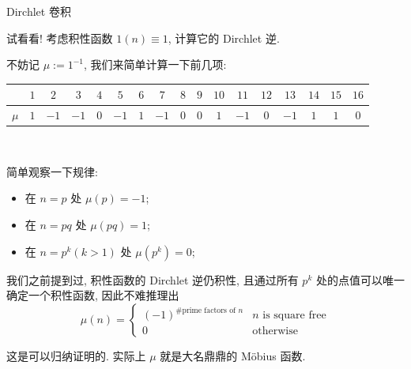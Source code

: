 \documentclass{beamer}
\begin{document}
    \begin{frame}{Dirchlet 卷积}
        \begin{block}{试看看!}
            考虑积性函数 $1(n)\equiv 1$, 计算它的 Dirchlet 逆.
        \end{block}
        \pause
        不妨记 $\mu:=1^{-1}$, 我们来简单计算一下前几项:
        \begin{center}
            \begin{tabular}{c|cccccccccccccccc}
                \toprule
                      & $1$ & $2$  & $3$  & $4$ & $5$  & $6$ & $7$  & $8$ & $9$ & $10$ & $11$ & $12$ & $13$ & $14$ & $15$ & $16$\\
                \hline
                $\mu$ & $1$ & $-1$ & $-1$ & $0$ & $-1$ & $1$ & $-1$ & $0$ & $0$ & $1$  & $-1$ &  $0$ & $-1$ &  $1$ &  $1$ &  $0$\\
                \bottomrule
            \end{tabular}\\
        \end{center}
        简单观察一下规律:
        \begin{itemize}
            \item 在 $n=p$ 处 $\mu(p)=-1$;
            \item 在 $n=pq$ 处 $\mu(pq)=1$;
            \item 在 $n=p^k(k>1)$ 处 $\mu(p^k)=0$;
        \end{itemize}
        我们之前提到过, 积性函数的 Dirchlet 逆仍积性, 且通过所有 $p^k$ 处的点值可以唯一确定一个积性函数, 因此不难推理出
        $$
        \mu(n)=\begin{cases}
        (-1)^{\#\text{prime factors of }n} & n\text{ is square free}\\
        0 & \text{otherwise}
        \end{cases}
        $$

        这是可以归纳证明的. 实际上 $\mu$ 就是大名鼎鼎的 M\"obius 函数.
    \end{frame}
\end{document}
